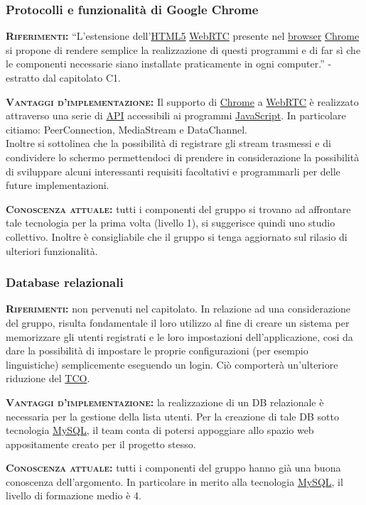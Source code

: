 \subsubsection{Protocolli e funzionalità di Google Chrome}
\begin{description}
	\item{\scshape\bfseries Riferimenti:}
  ``L'estensione dell'\underline{HTML5} \underline{WebRTC} presente nel \underline{browser} \underline{Chrome} si propone di rendere semplice la realizzazione di questi programmi e di far sì che le componenti necessarie siano installate praticamente in ogni computer.'' - estratto dal capitolato C1.
  
 	\item{\scshape\bfseries Vantaggi d'implementazione:} Il supporto di \underline{Chrome} a \underline{WebRTC} è realizzato attraverso una serie di \underline{API} accessibili ai programmi \underline{JavaScript}. In particolare citiamo: PeerConnection, MediaStream e DataChannel.\\Inoltre si sottolinea che la possibilità di registrare gli stream trasmessi e di condividere lo schermo permettendoci di prendere in considerazione la possibilità di sviluppare alcuni interessanti requisiti facoltativi e programmarli per delle future implementazioni.
	
	\item{\scshape\bfseries Conoscenza attuale:} tutti i componenti del gruppo si trovano ad affrontare tale tecnologia per la prima volta (livello 1), si suggerisce quindi uno studio collettivo. Inoltre è consigliabile che il gruppo si tenga aggiornato sul rilasio di ulteriori funzionalità.
\end{description}

\subsubsection{Database relazionali}
\begin{description}
	\item{\scshape\bfseries Riferimenti:} non pervenuti nel capitolato. In relazione ad una considerazione del gruppo, risulta fondamentale il loro utilizzo al fine di creare un sistema per memorizzare gli utenti registrati e le loro impostazioni dell'applicazione, cosi da dare la possibilità di impostare le proprie configurazioni (per esempio linguistiche) semplicemente eseguendo un login. Ciò comporterà un'ulteriore riduzione del \underline{TCO}.
  
 	\item{\scshape\bfseries Vantaggi d'implementazione:} la realizzazione di un DB relazionale è necessaria per la gestione della lista utenti. Per la creazione di tale DB sotto tecnologia \underline{MySQL}, il team conta di potersi appoggiare allo spazio web appositamente creato per il progetto stesso.
	
	\item{\scshape\bfseries Conoscenza attuale:} tutti i componenti del gruppo hanno già una buona conoscenza dell'argomento. In particolare in merito alla tecnologia \underline{MySQL}, il livello di formazione medio è 4.
\end{description}

